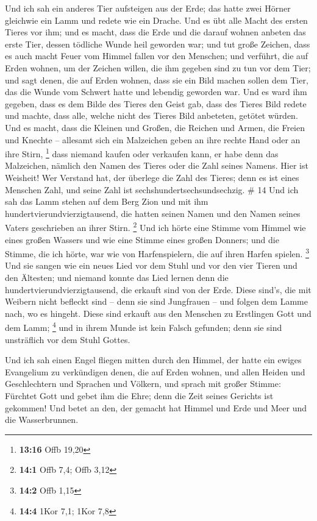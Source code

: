  Und ich sah ein anderes Tier aufsteigen aus der Erde;
das hatte zwei Hörner gleichwie ein Lamm und redete wie ein Drache.
 Und es übt alle Macht des ersten Tieres vor ihm; und es
macht, dass die Erde und die darauf wohnen anbeten das erste Tier,
dessen tödliche Wunde heil geworden war;  und tut große
Zeichen, dass es auch macht Feuer vom Himmel fallen vor den Menschen;
 und verführt, die auf Erden wohnen, um der Zeichen
willen, die ihm gegeben sind zu tun vor dem Tier; und sagt denen, die
auf Erden wohnen, dass sie ein Bild machen sollen dem Tier, das die
Wunde vom Schwert hatte und lebendig geworden war.  Und
es ward ihm gegeben, dass es dem Bilde des Tieres den Geist gab, dass
des Tieres Bild redete und machte, dass alle, welche nicht des Tieres
Bild anbeteten, getötet würden.  Und es macht, dass die
Kleinen und Großen, die Reichen und Armen, die Freien und Knechte --
allesamt sich ein Malzeichen geben an ihre rechte Hand oder an ihre
Stirn, \footnote{\textbf{13:16} Offb 19,20}  dass niemand
kaufen oder verkaufen kann, er habe denn das Malzeichen, nämlich den
Namen des Tieres oder die Zahl seines Namens.  Hier ist
Weisheit! Wer Verstand hat, der überlege die Zahl des Tieres; denn es
ist eines Menschen Zahl, und seine Zahl ist sechshundertsechsundsechzig.
\# 14  Und ich sah das Lamm stehen auf dem Berg Zion und
mit ihm hundertvierundvierzigtausend, die hatten seinen Namen und den
Namen seines Vaters geschrieben an ihrer Stirn. \footnote{\textbf{14:1}
  Offb 7,4; Offb 3,12}  Und ich hörte eine Stimme vom
Himmel wie eines großen Wassers und wie eine Stimme eines großen
Donners; und die Stimme, die ich hörte, war wie von Harfenspielern, die
auf ihren Harfen spielen. \footnote{\textbf{14:2} Offb 1,15}
 Und sie sangen wie ein neues Lied vor dem Stuhl und vor
den vier Tieren und den Ältesten; und niemand konnte das Lied lernen
denn die hundertvierundvierzigtausend, die erkauft sind von der Erde.
 Diese sind's, die mit Weibern nicht befleckt sind -- denn
sie sind Jungfrauen -- und folgen dem Lamme nach, wo es hingeht. Diese
sind erkauft aus den Menschen zu Erstlingen Gott und dem Lamm;
\footnote{\textbf{14:4} 1Kor 7,1; 1Kor 7,8}  und in ihrem
Munde ist kein Falsch gefunden; denn sie sind unsträflich vor dem Stuhl
Gottes.

 Und ich sah einen Engel fliegen mitten durch den Himmel,
der hatte ein ewiges Evangelium zu verkündigen denen, die auf Erden
wohnen, und allen Heiden und Geschlechtern und Sprachen und Völkern,
 und sprach mit großer Stimme: Fürchtet Gott und gebet ihm
die Ehre; denn die Zeit seines Gerichts ist gekommen! Und betet an den,
der gemacht hat Himmel und Erde und Meer und die Wasserbrunnen.

